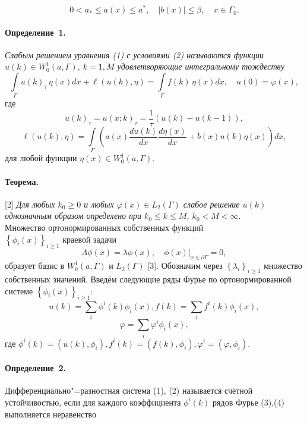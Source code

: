 \begin{equation*}{0<{{a}_{*}}\leqslant a(x)\leqslant{{a}^{*}},\quad|b(x)|\leqslant \beta,\quad x\in {{\Gamma }_{0}}.}\end{equation*}

\paragraph{Определение~1.} {\it Слабым решением уравнения (1) с условиями (2) называются функции $ u(k)\in W_{0}^{1}(a,\Gamma ) $, $ k=\overline{1, M} $ удовлетворяющие интегральному тождеству}
$$
	\int\limits_{\Gamma}u(k)_{\tau}\,\eta(x)dx+\ell(u(k),\eta)=
	\int\limits_{\Gamma}f(k)\,\eta(x) dx
	,\quad u(0)=\varphi(x),
$$
где $$ u(k)_{\tau}=u(x;k)_{\tau}=\frac{1}{\tau}(u(k)-u(k-1)),$$
$$\ell(u(k),\eta)=\int\limits_{\Gamma}\left(a(x)\frac{d u(k)}{d x}\frac{d \eta(x)}{d x}+b(x)u(k)\eta(x)\right)dx,$$
для любой функции $ \eta (x)\in W_{0}^{1}(a,\Gamma ) $.
\paragraph{Теорема.}[2] {\it Для любых $k_0\geqslant0$ и любых $\varphi(x)\in L_2(\Gamma)$ слабое решение $u(k)$ однозначным образом определено при $k_0\leqslant k\leqslant M$, $k_0<M<\infty$}.
\\

Множество ортонормированных собственных функций \\$\left\lbrace {\phi }_{i}(x) \right\rbrace_{i \geqslant 1}$ краевой задачи $$\Lambda \phi(x) =\lambda \phi(x),\quad \phi(x){{|}_{x\in \partial \Gamma }}=0,$$ образует базис в $W_{0}^{1}(a,\Gamma )$ и ${{L}_{2}}(\Gamma )$ [3]. Обозначим через $\left\lbrace \lambda_{i}\right\rbrace_{i \geqslant 1}$ множество собственных значений.
Введём следующие ряды Фурье по ортонормированной системе $\left\{\phi_{i}(x)\right\}_{i \geqslant 1}$:
\begin{equation}{
u(k)=\sum_{i}\phi^{i}(k) \phi_{i}(x), f(k)=\sum_{i} f^{i}(k) \phi_{i}(x)},\end{equation}
\begin{equation}{
\varphi=\sum_{i} \varphi^{i} \phi_{i}(x),
}
\end{equation}
где $\phi^{i}(k)=\left(u(k), \phi_{i}\right), f^{i}(k)=\left(f(k), \phi_{i}\right), \varphi^{i}=\left(\varphi, \phi_{i}\right)$.

\paragraph{Определение~2.}Дифференциально"=разностная система (1), (2) называется счётной устойчивостью, если для каждого коэффициента $\phi^{i}(k) $ рядов Фурье (3),(4) выполняется неравенство

